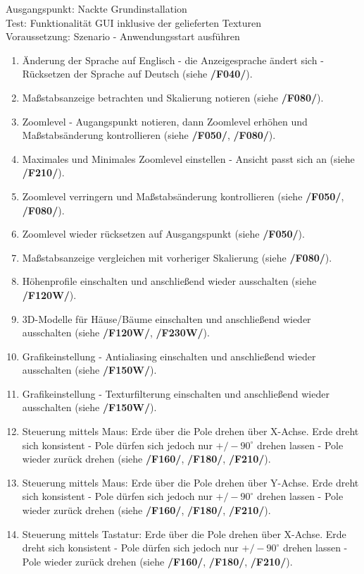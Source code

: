 \documentclass[10pt]{scrreprt}
\begin{document}
\vspace{1.0cm}
Ausgangspunkt: Nackte Grundinstallation \\
Test: Funktionalität GUI inklusive der gelieferten Texturen \\
Voraussetzung: Szenario - Anwendungsstart ausführen
\begin{enumerate}[leftmargin = 2.5cm, resume]
\item Änderung der Sprache auf Englisch - die Anzeigesprache ändert sich - Rücksetzen der Sprache auf Deutsch (siehe \textbf{/F040/}).
\item Maßstabsanzeige betrachten und Skalierung notieren (siehe \textbf{/F080/}).
\item Zoomlevel - Augangspunkt notieren, dann Zoomlevel erhöhen und Maßstabsänderung kontrollieren (siehe \textbf{/F050/}, \textbf{/F080/}).
\item Maximales und Minimales Zoomlevel einstellen - Ansicht passt sich an (siehe \textbf{/F210/}).
\item Zoomlevel verringern und Maßstabsänderung kontrollieren (siehe \textbf{/F050/}, \textbf{/F080/}).
\item Zoomlevel wieder rücksetzen auf Ausgangspunkt (siehe \textbf{/F050/}).
\item Maßstabsanzeige vergleichen mit vorheriger Skalierung (siehe \textbf{/F080/}).
\wunsch
\item Höhenprofile einschalten und anschließend wieder ausschalten (siehe \textbf{/F120W/}).
\item 3D-Modelle für Häuse/Bäume einschalten und anschließend wieder ausschalten (siehe \textbf{/F120W/}, \textbf{/F230W/}).
\item Grafikeinstellung - Antialiasing einschalten und anschließend wieder ausschalten (siehe \textbf{/F150W/}).
\item Grafikeinstellung - Texturfilterung einschalten und anschließend wieder ausschalten (siehe \textbf{/F150W/}).
\muss
\item Steuerung mittels Maus: Erde über die Pole drehen über X-Achse. Erde dreht sich konsistent - Pole dürfen sich jedoch nur $+/- 90^\circ$ drehen lassen - Pole wieder zurück drehen (siehe \textbf{/F160/}, \textbf{/F180/}, \textbf{/F210/}).
\item Steuerung mittels Maus: Erde über die Pole drehen über Y-Achse. Erde dreht sich konsistent - Pole dürfen sich jedoch nur $+/- 90^\circ$ drehen lassen - Pole wieder zurück drehen (siehe \textbf{/F160/}, \textbf{/F180/}, \textbf{/F210/}).
\item Steuerung mittels Tastatur: Erde über die Pole drehen über X-Achse. Erde dreht sich konsistent - Pole dürfen sich jedoch nur $+/- 90^\circ$ drehen lassen - Pole wieder zurück drehen (siehe \textbf{/F160/}, \textbf{/F180/}, \textbf{/F210/}).

\end{enumerate}
\end{document}
